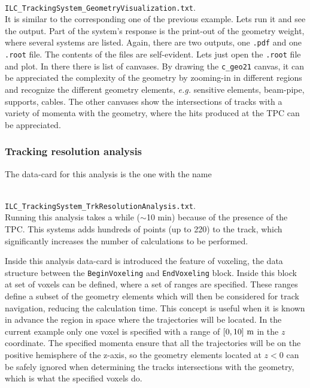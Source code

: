 ~\\
{\small {\tt ILC\_TrackingSystem\_GeometryVisualization.txt}}.
~\\

\noindent
It is similar to the corresponding one of the previous example. Lets run it and see the output. Part of the system's response is the print-out of the geometry weight, where several systems 
are listed. Again, there are two outputs, one {\tt .pdf} and one {\tt .root} file. The contents of the files are self-evident. Lets just open the {\tt .root} file and plot. In there there is 
list of canvases. By drawing the {\tt c\_geo21} canvas, it can be appreciated the complexity of the geometry by zooming-in in different regions and recognize the different geometry elements,
{\it e.g.} sensitive elements, beam-pipe, supports, cables. The other canvases show the intersections of tracks with a variety of momenta with the geometry, where the hits produced at the 
TPC can be appreciated.

\subsubsection*{Tracking resolution analysis}

The data-card for this analysis is the one with the name

~\\
{\small {\tt ILC\_TrackingSystem\_TrkResolutionAnalysis.txt}}.
~\\

\noindent
Running this analysis takes a while ($\sim$10 min) because of the presence of the TPC. This systems adds hundreds of points (up to 220) to the track, which significantly increases the 
number of calculations to be performed.

Inside this analysis data-card is introduced the feature of voxeling, the data structure between the {\tt BeginVoxeling} and {\tt EndVoxeling} block. Inside this block at set of 
voxels can be defined, where a set of ranges are specified. These ranges define a subset of the geometry elements which will then be considered for track navigation, reducing the 
calculation time. This concept is useful when it is known in advance the region in space where the trajectories will be located. In the current example only one voxel is specified with 
a range of $[0,10]~{\rm m}$ in the $z$ coordinate. The specified momenta ensure that all the trajectories will be on the positive hemisphere of the z-axis, so the geometry elements located 
at $z < 0$ can be safely ignored when determining the tracks intersections with the geometry, which is what the specified voxels do.

